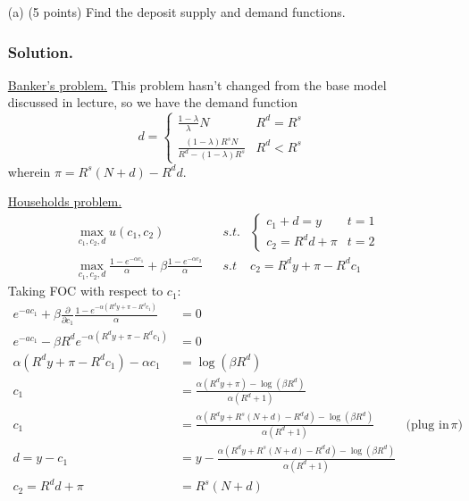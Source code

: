 \documentclass[12pt]{article}
\begin{document}
\begin{enumerate}
    \begin{enumerate}
        \item[(a)] {(5 points)} Find the deposit supply and demand functions.
        \subsubsection*{Solution.}

        

        \underline{Banker's problem.} This problem hasn't changed from the base model discussed in lecture, so we have the demand function 
        \[  d= \begin{cases}
                \frac{1-\lambda}{\lambda}N &R^d = R^s
                \\ \frac{(1-\lambda)R^sN}{R^d - (1-\lambda)R^s} & R^d < R^s
            \end{cases}\]
            wherein $\pi = R^s(N+d)-R^dd.$
            
        \underline{Households problem.}
        \begin{align*}
            &\max_{c_1,c_2,d} u(c_1,c_2) 
            && s.t. &\begin{cases}
                c_1 + d = y & t=1 \\ c_2 = R^d d + \pi & t=2 
            \end{cases}
            \\ &\max_{c_1,c_2,d}  \frac{1 - e^{-\alpha c_1}}{\alpha} + \beta \frac{1 - e^{-\alpha c_2}}{\alpha} && s.t & c_2 = R^d y + \pi - R^d c_1
        \end{align*}
        Taking FOC with respect to  $c_1$:    
        \begin{align*}
            e^{-ac_1} + \beta \frac{\partial }{\partial c_1 }\frac{1 - e^{-\alpha (R^d y + \pi - R^d c_1)}}{\alpha}   &= 0
            \\  e^{-ac_1} - \beta R^de^{-\alpha (R^d y + \pi - R^d c_1)}   &= 0
            \\ \alpha\left(R^{d}y+\pi-R^{d}c_{1}\right)-\alpha c_{1}&=\log\left(\beta R^{d}\right)
            \\ c_{1}&=\frac{\alpha\left(R^{d}y+\pi\right)-\log\left(\beta R^{d}\right)}{\alpha(R^{d}+1)} 
            \\ c_{1}&=\frac{\alpha\left(R^{d}y+R^{s}(N+d)-R^{d}d\right)-\log\left(\beta R^{d}\right)}{\alpha(R^{d}+1)} & \text{(plug in $\pi$)}
            \\ d = y - c_1  &= y - \frac{\alpha\left(R^{d}y+R^{s}(N+d)-R^{d}d\right)-\log\left(\beta R^{d}\right)}{\alpha(R^{d}+1)} 
            \\ c_2 = R^d d + \pi &=  R^{s}\left(N+d\right)
        \end{align*}


\end{enumerate}
\end{enumerate}
\end{document}
